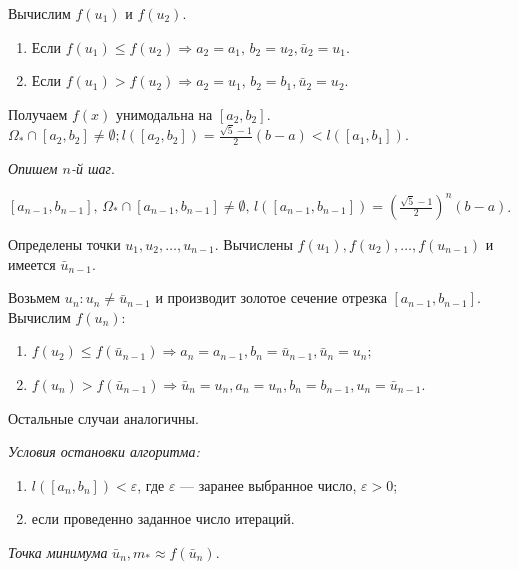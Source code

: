 Вычислим $f(u_1)$ и $f(u_2)$.
\begin{enumerate}[label={\arabic*)}]
	\item Если $f(u_1) \leqslant f(u_2) \Rightarrow a_2 = a_1, \, b_2 = u_2, \bar{u}_2 = u_1$.
	
	\item Если $f(u_1) > f(u_2) \Rightarrow a_2 = u_1, \, b_2 = b_1, \bar{u}_2 = u_2$.
\end{enumerate}

Получаем $f(x)$ унимодальна на $[a_2, b_2]$. $\Omega_{\ast} \cap [a_2, b_2] \not = \emptyset; l([a_2, b_2]) = \frac{\sqrt{5} - 1}{2} (b - a) < l([a_1, b_1])$.
\newline

\textit{Опишем $n$-й шаг}. 

$[a_{n - 1}, b_{n - 1}], \, \Omega_{\ast} \cap [a_{n - 1}, b_{n - 1}] \not = \emptyset, \, l([a_{n - 1}, b_{n - 1}]) = \left(\frac{\sqrt{5} - 1}{2}\right)^n (b - a)$.

Определены точки $u_1, u_2, \dotsc, u_{n - 1}$. Вычислены $f(u_1), f(u_2), \dotsc, f(u_{n - 1})$ и имеется $\bar{u}_{n - 1}$.

Возьмем $u_n: u_n \not = \bar{u}_{n - 1}$ и производит золотое сечение отрезка $[a_{n - 1}, b_{n - 1}]$. Вычислим $f(u_n)$:
\begin{enumerate}[label={\arabic*)}]
	\item $f(u_2) \leqslant f(\bar{u}_{n - 1}) \Rightarrow a_n = a_{n - 1}, b_n = \bar{u}_{n - 1}, \bar{u}_n = u_n$;
	
	\item $f(u_n) > f(\bar{u}_{n - 1}) \Rightarrow \bar{u}_n = u_n, a_n = u_n, b_n = b_{n - 1}, u_n = \bar{u}_{n - 1}$. 
\end{enumerate}

Остальные случаи аналогичны. 
\newline

\textit{Условия остановки алгоритма:}
\begin{enumerate}
	\item $l([a_n, b_n]) < \varepsilon$, где $\varepsilon$ --- заранее выбранное число, $\varepsilon > 0$;
	
	\item если проведенно заданное число итераций. 
\end{enumerate}

\textit{Точка минимума} $\bar{u}_n, m_{\ast} \approx f(\bar{u}_n)$.